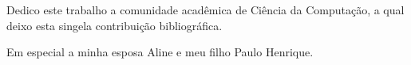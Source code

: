%
%

\begin{dedicatoria}

Dedico este trabalho a comunidade acadêmica de Ciência da Computação, a qual deixo esta singela contribuição bibliográfica.

Em especial a minha esposa Aline e meu filho Paulo Henrique. 

\end{dedicatoria}
